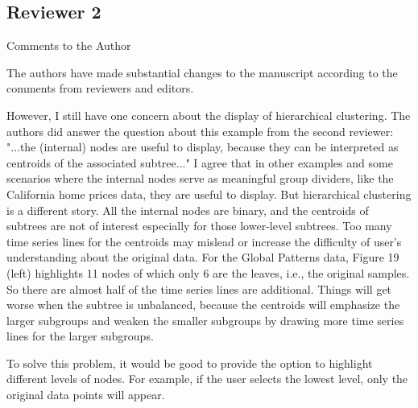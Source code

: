 \documentclass{article}
\begin{document}
\color{black}

\subsection{Reviewer 2}
\label{subsec:reviewer_2}

\color{blue}
Comments to the Author

The authors have made substantial changes to the
manuscript according to the comments from reviewers and editors.

However, I still have one concern about the display of hierarchical clustering.
The authors did answer the question about this example from the second reviewer:
"...the (internal) nodes are useful to display, because they can be interpreted
as centroids of the associated subtree..." I agree that in other examples and
some scenarios where the internal nodes serve as meaningful group dividers, like
the California home prices data, they are useful to display. But hierarchical
clustering is a different story. All the internal nodes are binary, and the
centroids of subtrees are not of interest especially for those lower-level
subtrees. Too many time series lines for the centroids may mislead or increase
the difficulty of user's understanding about the original data. For the Global
Patterns data, Figure 19 (left) highlights 11 nodes of which only 6 are the
leaves, i.e., the original samples. So there are almost half of the time series
lines are additional. Things will get worse when the subtree is unbalanced,
because the centroids will emphasize the larger subgroups and weaken the smaller
subgroups by drawing more time series lines for the larger subgroups.

To solve this problem, it would be good to provide the option to highlight
different levels of nodes. For example, if the user selects the lowest level,
only the original data points will appear.

\color{black}
\end{document}
